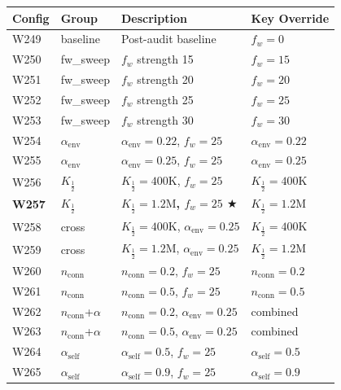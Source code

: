 \documentclass[11pt,a4paper,oneside]{article}
\begin{document}
\begin{table}[H]
\centering
\small
\begin{tabular}{llll}
\toprule
\textbf{Config} & \textbf{Group} & \textbf{Description} & \textbf{Key Override} \\
\midrule
W249 & baseline & Post-audit baseline & $f_w = 0$ \\
\rowcolor{lightgray}
W250 & fw\_sweep & $f_w$ strength 15 & $f_w = 15$ \\
W251 & fw\_sweep & $f_w$ strength 20 & $f_w = 20$ \\
\rowcolor{lightgray}
W252 & fw\_sweep & $f_w$ strength 25 & $f_w = 25$ \\
W253 & fw\_sweep & $f_w$ strength 30 & $f_w = 30$ \\
\rowcolor{lightgray}
W254 & $\alpha_{\text{env}}$ & $\alpha_{\text{env}} = 0.22$, $f_w = 25$ & $\alpha_{\text{env}} = 0.22$ \\
W255 & $\alpha_{\text{env}}$ & $\alpha_{\text{env}} = 0.25$, $f_w = 25$ & $\alpha_{\text{env}} = 0.25$ \\
\rowcolor{lightgray}
W256 & $K_{\frac{1}{2}}$ & $K_{\frac{1}{2}} = 400\text{K}$, $f_w = 25$ & $K_{\frac{1}{2}} = 400\text{K}$ \\
\textbf{W257} & \textbf{$K_{\frac{1}{2}}$} & \textbf{$K_{\frac{1}{2}} = 1.2\text{M}$, $f_w = 25$ $\bigstar$} & \textbf{$K_{\frac{1}{2}} = 1.2\text{M}$} \\
\rowcolor{lightgray}
W258 & cross & $K_{\frac{1}{2}} = 400\text{K}$, $\alpha_{\text{env}} = 0.25$ & $K_{\frac{1}{2}} = 400\text{K}$ \\
W259 & cross & $K_{\frac{1}{2}} = 1.2\text{M}$, $\alpha_{\text{env}} = 0.25$ & $K_{\frac{1}{2}} = 1.2\text{M}$ \\
\rowcolor{lightgray}
W260 & $n_{\text{conn}}$ & $n_{\text{conn}} = 0.2$, $f_w = 25$ & $n_{\text{conn}} = 0.2$ \\
W261 & $n_{\text{conn}}$ & $n_{\text{conn}} = 0.5$, $f_w = 25$ & $n_{\text{conn}} = 0.5$ \\
\rowcolor{lightgray}
W262 & $n_{\text{conn}}$+$\alpha$ & $n_{\text{conn}} = 0.2$, $\alpha_{\text{env}} = 0.25$ & combined \\
W263 & $n_{\text{conn}}$+$\alpha$ & $n_{\text{conn}} = 0.5$, $\alpha_{\text{env}} = 0.25$ & combined \\
\rowcolor{lightgray}
W264 & $\alpha_{\text{self}}$ & $\alpha_{\text{self}} = 0.5$, $f_w = 25$ & $\alpha_{\text{self}} = 0.5$ \\
W265 & $\alpha_{\text{self}}$ & $\alpha_{\text{self}} = 0.9$, $f_w = 25$ & $\alpha_{\text{self}} = 0.9$ \\

\end{tabular}
\end{table}
\end{document}
